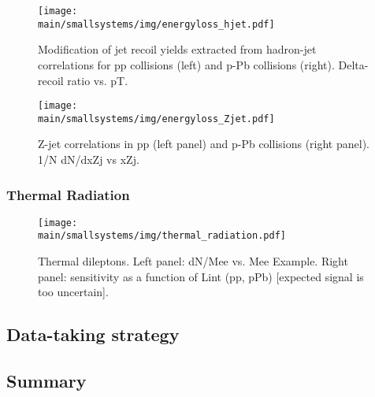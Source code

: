 \documentclass[../report.tex]{subfiles}
\providecommand{\main}{..}
\begin{document}
\begin{figure}[ht]
\centering
\texttt{[image: \\main/smallsystems/img/energyloss\_hjet.pdf]}
\caption{Modification of jet recoil yields extracted from hadron-jet correlations for pp collisions (left) and p-Pb collisions (right). Delta-recoil ratio vs. pT.}
\label{fig:smallsystems_energyloss_hjet}
\end{figure}

\begin{figure}[ht]
\centering
\texttt{[image: \\main/smallsystems/img/energyloss\_Zjet.pdf]}

\caption{Z-jet correlations in pp (left panel) and p-Pb collisions (right panel). 1/N dN/dxZj vs xZj.}
\label{fig:smallsystems_energyloss_Zjet}
\end{figure}

\subsubsection{Thermal Radiation}

\begin{figure}[ht]
\centering
\texttt{[image: \\main/smallsystems/img/thermal\_radiation.pdf]}
\caption{Thermal dileptons. Left panel: dN/Mee vs. Mee Example. Right panel: sensitivity as a function of Lint (pp, pPb) [expected signal is too uncertain].}
\label{fig:smallsystems_thermal_radition}
\end{figure}

\subsection{Data-taking strategy}


\subsection{Summary}
\end{document}
